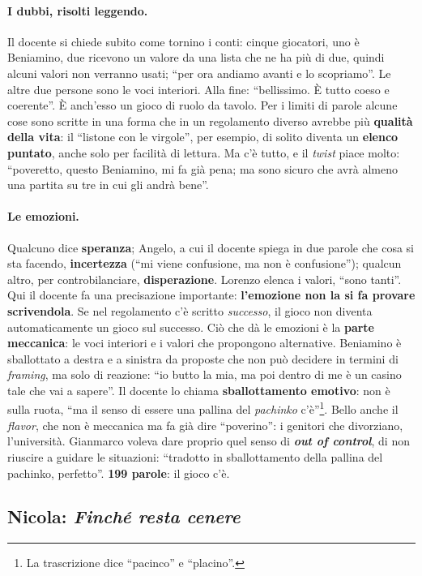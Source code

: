 \paragraph{I dubbi, risolti leggendo.} Il docente si chiede subito come tornino i
conti: cinque giocatori, uno è Beniamino, due ricevono un valore da una lista che ne
ha più di due, quindi alcuni valori non verranno usati; ``per ora andiamo avanti e lo
scopriamo''. Le altre due persone sono le voci interiori. Alla fine: ``bellissimo. È
tutto coeso e coerente''. È anch'esso un gioco di ruolo da tavolo. Per i limiti di
parole alcune cose sono scritte in una forma che in un regolamento diverso avrebbe più
\textbf{qualità della vita}: il ``listone con le virgole'', per esempio, di solito
diventa un \textbf{elenco puntato}, anche solo per facilità di lettura. Ma c'è tutto,
e il \emph{twist} piace molto: ``poveretto, questo Beniamino, mi fa già pena; ma sono
sicuro che avrà almeno una partita su tre in cui gli andrà bene''.

\paragraph{Le emozioni.} Qualcuno dice \textbf{speranza}; Angelo, a cui il docente
spiega in due parole che cosa si sta facendo, \textbf{incertezza} (``mi viene
confusione, ma non è confusione''); qualcun altro, per controbilanciare,
\textbf{disperazione}. Lorenzo elenca i valori, ``sono tanti''. Qui il docente fa una
precisazione importante: \textbf{l'emozione non la si fa provare scrivendola}. Se nel
regolamento c'è scritto \emph{successo}, il gioco non diventa automaticamente un
gioco sul successo. Ciò che dà le emozioni è la \textbf{parte meccanica}: le voci
interiori e i valori che propongono alternative. Beniamino è sballottato a destra e a
sinistra da proposte che non può decidere in termini di \emph{framing}, ma solo di
reazione: ``io butto la mia, ma poi dentro di me è un casino tale che vai a sapere''.
Il docente lo chiama \textbf{sballottamento emotivo}: non è sulla ruota, ``ma il senso
di essere una pallina del \emph{pachinko} c'è''\footnote{La trascrizione dice
``pacinco'' e ``placino''.}. Bello anche il \emph{flavor}, che non è meccanica ma fa
già dire ``poverino'': i genitori che divorziano, l'università. Gianmarco voleva dare
proprio quel senso di \textbf{\emph{out of control}}, di non riuscire a guidare le
situazioni: ``tradotto in sballottamento della pallina del pachinko, perfetto''.
\textbf{199 parole}: il gioco c'è.

\subsection{Nicola: \emph{Finché resta cenere}}
\label{a6:sec:cenere}

